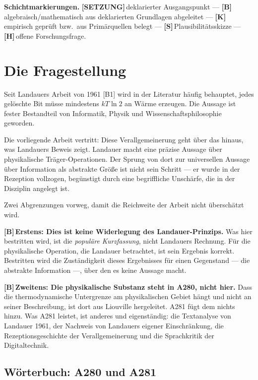 \documentclass[11pt,a4paper]{article}
\newcommand{\LS}{\textcolor{laySet}{\textbf{\footnotesize\textsf{[SETZUNG]}}}\,}
\newcommand{\LK}{\textcolor{layK}{\textbf{\footnotesize\textsf{[K]}}}\,}
\newcommand{\LB}{\textcolor{layB}{\textbf{\footnotesize\textsf{[B]}}}\,}
\newcommand{\LSk}{\textcolor{layS}{\textbf{\footnotesize\textsf{[S]}}}\,}
\newcommand{\LH}{\textcolor{layH}{\textbf{\footnotesize\textsf{[H]}}}\,}
\theoremstyle{ffgft}
\begin{document}
\bigskip

\begingroup\small\noindent
\textbf{Schichtmarkierungen.} \LS deklarierter Ausgangspunkt ---
\LB algebraisch/mathematisch aus deklarierten Grundlagen abgeleitet ---
\LK empirisch geprüft bzw.\ aus Primärquellen belegt ---
\LSk Plausibilitätsskizze ---
\LH offene Forschungsfrage.
\par\endgroup

\bigskip

\section{Die Fragestellung}

Seit Landauers Arbeit von 1961 [B1] wird in der Literatur häufig behauptet, jedes
gelöschte Bit müsse mindestens $kT\ln 2$ an Wärme erzeugen. Die Aussage ist fester
Bestandteil von Informatik, Physik und Wissenschaftsphilosophie geworden.

Die vorliegende Arbeit vertritt: Diese Verallgemeinerung geht über das hinaus, was
Landauers Beweis zeigt. Landauer macht eine präzise Aussage über physikalische
Träger-Operationen. Der Sprung von dort zur universellen Aussage über Information
als abstrakte Größe ist nicht sein Schritt --- er wurde in der Rezeption
vollzogen, begünstigt durch eine begriffliche Unschärfe, die in der Disziplin
angelegt ist.

Zwei Abgrenzungen vorweg, damit die Reichweite der Arbeit nicht überschätzt wird.

\LB \textbf{Erstens: Dies ist keine Widerlegung des Landauer-Prinzips.} Was hier
bestritten wird, ist die \emph{populäre Kurzfassung}, nicht Landauers Rechnung.
Für die physikalische Operation, die Landauer betrachtet, ist sein Ergebnis
korrekt. Bestritten wird die Zuständigkeit dieses Ergebnisses für einen Gegenstand
--- die abstrakte Information ---, über den es keine Aussage macht.

\LB \textbf{Zweitens: Die physikalische Substanz steht in A280, nicht hier.} Dass
die thermodynamische Untergrenze am physikalischen Gebiet hängt und nicht an
seiner Beschreibung, ist dort aus Liouville hergeleitet. A281 fügt dem nichts
hinzu. Was A281 leistet, ist anderes und eigenständig: die Textanalyse von
Landauer 1961, der Nachweis von Landauers eigener Einschränkung, die
Rezeptionsgeschichte der Verallgemeinerung und die Sprachkritik der Digitaltechnik.

\subsection{Wörterbuch: A280 und A281}
\label{sec:woerterbuch}
\end{document}
